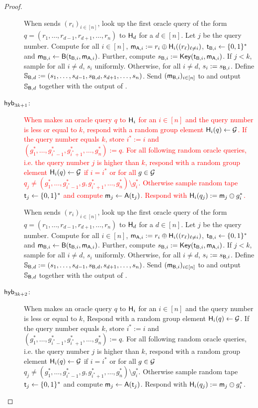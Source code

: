 \begin{proof}
\begin{description}
When \Adv sends $(r_i)_{i\in[n]}$, look up the first oracle query of the form $q= (r_1,\dots, r_{d-1},r_{d+1},\dots, r_{n})$ to $\mathsf{H}_d$ for a $d\in[n]$. Let $j$ be the query number. Compute for all $i\in[n]$, $\mathsf{m}_{\mathsf{A},i}:=r_i\oplus\mathsf{H}_i((r_\ell)_{\ell\neq i})$, $\mathsf{t}_{\mathsf{B},i}\leftarrow\{0,1\}^*$ and $\mathsf{m}_{\mathsf{B},i}\leftarrow\mathsf{B}(\mathsf{t}_{\mathsf{B},i},\mathsf{m}_{\mathsf{A},i})$. Further, compute $s_{\mathsf{B},i}:=\mathsf{Key}(\mathsf{t}_{\mathsf{B},i},\mathsf{m}_{\mathsf{A},i})$. If $j<k$, sample for all $i\neq d$, $s_i$ uniformly. Otherwise, for all $i\neq d$, $s_i:=s_{\mathsf{B},i}$.   Define $\mathsf{\mathbb S}_{\mathsf{B},d}:=(s_{1},\dots, s_{d-1},s_{\mathsf{B},d},s_{d+1},\dots, s_{n})$.  
 Send $(\mathsf{m}_{\mathsf{B},i})_{i\in[n]}$ to \Adv and output $\mathsf{\mathbb S}_{\mathsf{B},d}$ together with the output of \Adv. 
\item[$\mathsf{hyb}_{3k+1}$:]  \textcolor{red}{When \Adv makes an oracle query $q$ to $\mathsf{H}_i$ for an $i\in[n]$ and the query number is less or equal to $k$, respond with a random group element $\mathsf{H}_i(q)\leftarrow\mathcal{G}$. 
If the query number equals $k$, store $i^*:=i$ and $(g^*_1,\dots, g^*_{i^*-1},g^*_{i^*+1},\dots, g^*_{n}):=q$. 
For all following random oracle queries, i.e. the query number $j$ is higher than $k$, respond with a random group element $\mathsf{H}_i(q)\leftarrow\mathcal{G}$ if $i=i^*$ or for all $g\in\mathcal{G}$ $q_j\neq (g^*_1,\dots, g^*_{i^*-1},g,g^*_{i^*+1},\dots, g^*_{n})\setminus g^*_i$. Otherwise sample random tape $\mathsf{t}_j\leftarrow\{0,1\}^*$ and compute $\mathsf{m}_{j}\leftarrow\mathsf{A}(\mathsf{t}_j)$. 
Respond with $\mathsf{H}_i(q_j):=\mathsf{m}_j\ominus g^*_{i}$.}

When \Adv sends $(r_i)_{i\in[n]}$, look up the first oracle query of the form $q= (r_1,\dots, r_{d-1},r_{d+1},\dots, r_{n})$ to $\mathsf{H}_d$ for a $d\in[n]$. Let $j$ be the query number. Compute for all $i\in[n]$, $\mathsf{m}_{\mathsf{A},i}:=r_i\oplus\mathsf{H}_i((r_\ell)_{\ell\neq i})$, $\mathsf{t}_{\mathsf{B},i}\leftarrow\{0,1\}^*$ and $\mathsf{m}_{\mathsf{B},i}\leftarrow\mathsf{B}(\mathsf{t}_{\mathsf{B},i},\mathsf{m}_{\mathsf{A},i})$. Further, compute $s_{\mathsf{B},i}:=\mathsf{Key}(\mathsf{t}_{\mathsf{B},i},\mathsf{m}_{\mathsf{A},i})$. If $j<k$, sample for all $i\neq d$, $s_i$ uniformly. Otherwise, for all $i\neq d$, $s_i:=s_{\mathsf{B},i}$.   Define $\mathsf{\mathbb S}_{\mathsf{B},d}:=(s_{1},\dots, s_{d-1},s_{\mathsf{B},d},s_{d+1},\dots, s_{n})$.  
 Send $(\mathsf{m}_{\mathsf{B},i})_{i\in[n]}$ to \Adv and output $\mathsf{\mathbb S}_{\mathsf{B},d}$ together with the output of \Adv. 
 \item[$\mathsf{hyb}_{3k+2}$:]  When \Adv makes an oracle query $q$ to $\mathsf{H}_i$ for an $i\in[n]$ and the query number is less or equal to $k$, Respond with a random group element $\mathsf{H}_i(q)\leftarrow\mathcal{G}$. 
If the query number equals $k$, store $i^*:=i$ and $(g^*_1,\dots, g^*_{i^*-1},g^*_{i^*+1},\dots, g^*_{n}):=q$. 
For all following random oracle queries, i.e. the query number $j$ is higher than $k$, respond with a random group element $\mathsf{H}_i(q)\leftarrow\mathcal{G}$ if $i=i^*$ or for all $g\in\mathcal{G}$ $q_j\neq (g^*_1,\dots, g^*_{i^*-1},g,g^*_{i^*+1},\dots, g^*_{n})\setminus g^*_i$. Otherwise sample random tape $\mathsf{t}_j\leftarrow\{0,1\}^*$ and compute $\mathsf{m}_{j}\leftarrow\mathsf{A}(\mathsf{t}_j)$. 
Respond with $\mathsf{H}_i(q_j):=\mathsf{m}_j\ominus g^*_{i}$. 


\end{description}
\end{proof}
